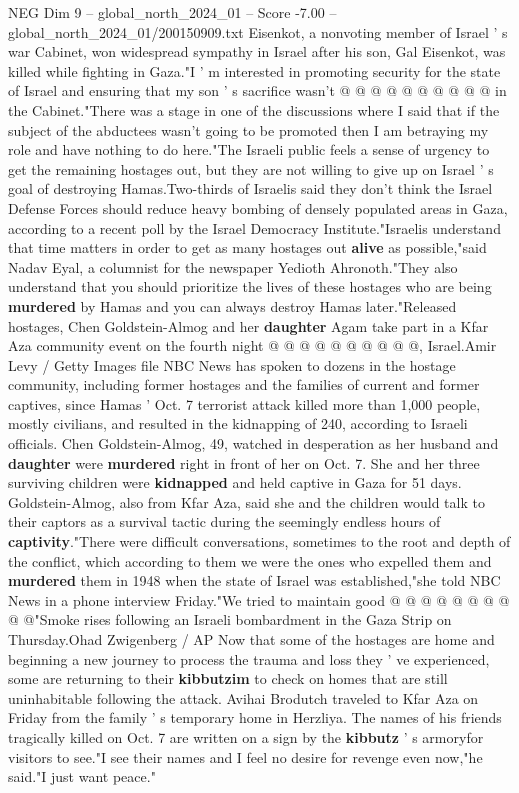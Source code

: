 \begin{textsample}{NEG Dim 9 – global\_north\_2024\_01 – Score -7.00 – global\_north\_2024\_01/200150909.txt}
Eisenkot, a nonvoting member of Israel ' s war Cabinet, won widespread sympathy in Israel after his son, Gal Eisenkot, was killed while fighting in Gaza."I ' m interested in promoting security for the state of Israel and ensuring that my son ' s sacrifice wasn't @ @ @ @ @ @ @ @ @ @ in the Cabinet."There was a stage in one of the discussions where I said that if the subject of the abductees wasn't going to be promoted then I am betraying my role and have nothing to do here."The Israeli public feels a sense of urgency to get the remaining hostages out, but they are not willing to give up on Israel ' s goal of destroying Hamas.Two-thirds of Israelis said they don't think the Israel Defense Forces should reduce heavy bombing of densely populated areas in Gaza, according to a recent poll by the Israel Democracy Institute."Israelis understand that time matters in order to get as many hostages out \textbf{alive} as possible,"said Nadav Eyal, a columnist for the newspaper Yedioth Ahronoth."They also understand that you should prioritize the lives of these hostages who are being \textbf{murdered} by Hamas and you can always destroy Hamas later."Released hostages, Chen Goldstein-Almog and her \textbf{daughter} Agam take part in a Kfar Aza community event on the fourth night @ @ @ @ @ @ @ @ @ @, Israel.Amir Levy / Getty Images file NBC News has spoken to dozens in the hostage community, including former hostages and the families of current and former captives, since Hamas ' Oct. 7 terrorist attack killed more than 1,000 people, mostly civilians, and resulted in the kidnapping of 240, according to Israeli officials.
Chen Goldstein-Almog, 49, watched in desperation as her husband and \textbf{daughter} were \textbf{murdered} right in front of her on Oct. 7.
She and her three surviving children were \textbf{kidnapped} and held captive in Gaza for 51 days.
Goldstein-Almog, also from Kfar Aza, said she and the children would talk to their captors as a survival tactic during the seemingly endless hours of \textbf{captivity}."There were difficult conversations, sometimes to the root and depth of the conflict, which according to them we were the ones who expelled them and \textbf{murdered} them in 1948 when the state of Israel was established,"she told NBC News in a phone interview Friday."We tried to maintain good @ @ @ @ @ @ @ @ @ @"Smoke rises following an Israeli bombardment in the Gaza Strip on Thursday.Ohad Zwigenberg / AP Now that some of the hostages are home and beginning a new journey to process the trauma and loss they ' ve experienced, some are returning to their \textbf{kibbutzim} to check on homes that are still uninhabitable following the attack.
Avihai Brodutch traveled to Kfar Aza on Friday from the family ' s temporary home in Herzliya.
The names of his friends tragically killed on Oct. 7 are written on a sign by the \textbf{kibbutz} ' s armoryfor visitors to see."I see their names and I feel no desire for revenge even now,"he said."I just want peace."

\end{textsample}
